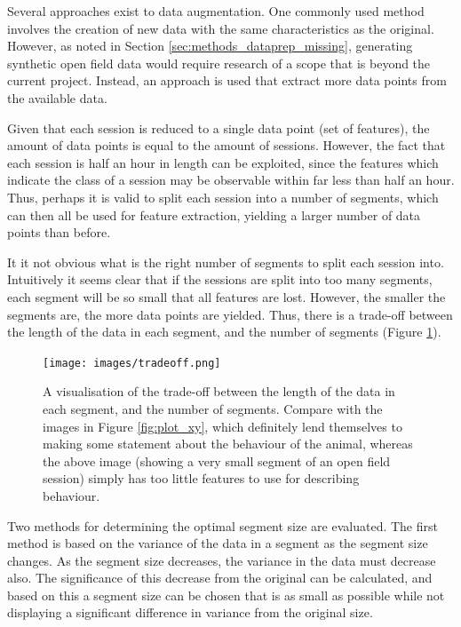 \documentclass[conference,a4paper,twoside]{IEEEtran}
\begin{document}
Several approaches exist to data augmentation. One commonly used method involves the creation of new data with the same characteristics as the original. However, as noted in Section \ref{sec:methods_dataprep_missing}, generating synthetic open field data would require research of a scope that is beyond the current project. Instead, an approach is used that extract more data points from the available data.

Given that each session is reduced to a single data point (set of features), the amount of data points is equal to the amount of sessions. However, the fact that each session is half an hour in length can be exploited, since the features which indicate the class of a session may be observable within far less than half an hour. Thus, perhaps it is valid to split each session into a number of segments, which can then all be used for feature extraction, yielding a larger number of data points than before.

It it not obvious what is the right number of segments to split each session into. Intuitively it seems clear that if the sessions are split into too many segments, each segment will be so small that all features are lost. However, the smaller the segments are, the more data points are yielded. Thus, there is a trade-off between the length of the data in each segment, and the number of segments (Figure \ref{fig:tradeoff}).

\begin{figure}
    \centering
    \texttt{[image: images/tradeoff.png]}
    \caption{A visualisation of the trade-off between the length of the data in each segment, and the number of segments. Compare with the images in Figure \ref{fig:plot_xy}, which definitely lend themselves to making some statement about the behaviour of the animal, whereas the above image (showing a very small segment of an open field session) simply has too little features to use for describing behaviour.}
    \label{fig:tradeoff}
\end{figure}

Two methods for determining the optimal segment size are evaluated. The first method is based on the variance of the data in a segment as the segment size changes. As the segment size decreases, the variance in the data must decrease also. The significance of this decrease from the original can be calculated, and based on this a segment size can be chosen that is as small as possible while not displaying a significant difference in variance from the original size.
\end{document}
